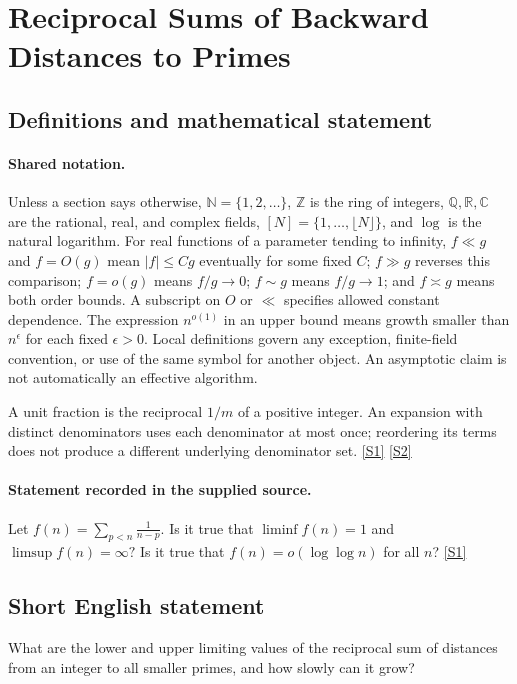 \documentclass[11pt,a4paper]{article}
\newcommand{\N}{\mathbb{N}}
\newcommand{\Z}{\mathbb{Z}}
\newcommand{\Q}{\mathbb{Q}}
\newcommand{\R}{\mathbb{R}}
\newcommand{\C}{\mathbb{C}}
\newcommand{\sref}[2]{\hyperlink{source:#1:#2}{[S#2]}}
\begin{document}
\section{Reciprocal Sums of Backward Distances to Primes}\label{statement}


\subsection{Definitions and mathematical statement}

\paragraph{Shared notation.}Unless a section says otherwise, $\N=\{1,2,\ldots\}$,
$\Z$ is the ring of integers, $\Q,\R,\C$ are the rational, real, and complex
fields, $[N]=\{1,\ldots,\lfloor N\rfloor\}$, and $\log$ is the natural
logarithm. For real functions of a parameter tending to infinity,
$f\ll g$ and $f=O(g)$ mean $|f|\leq Cg$ eventually for some fixed $C$;
$f\gg g$ reverses this comparison; $f=o(g)$ means $f/g\to0$;
$f\sim g$ means $f/g\to1$; and $f\asymp g$ means both order bounds.
A subscript on $O$ or $\ll$ specifies allowed constant dependence.
The expression $n^{o(1)}$ in an upper bound means growth smaller than
$n^\epsilon$ for each fixed $\epsilon>0$. Local definitions govern any
exception, finite-field convention, or use of the same symbol for another
object. An asymptotic claim is not automatically an effective algorithm.



A unit fraction is the reciprocal $1/m$ of a positive integer. An expansion with distinct denominators uses each denominator at most once; reordering its terms does not produce a different underlying denominator set. \sref{statement}{1} \sref{statement}{2}

\paragraph{Statement recorded in the supplied source.}
Let $ f(n) = \sum_{p<n}\frac{1}{n-p}. $ Is it true that $ \liminf f(n)=1 $ and $ \limsup f(n)=\infty? $ Is it true that $f(n)=o(\log\log n)$ for all $n$? \sref{statement}{1}

\subsection{Short English statement}

What are the lower and upper limiting values of the reciprocal sum of distances from an integer to all smaller primes, and how slowly can it grow?
\end{document}
